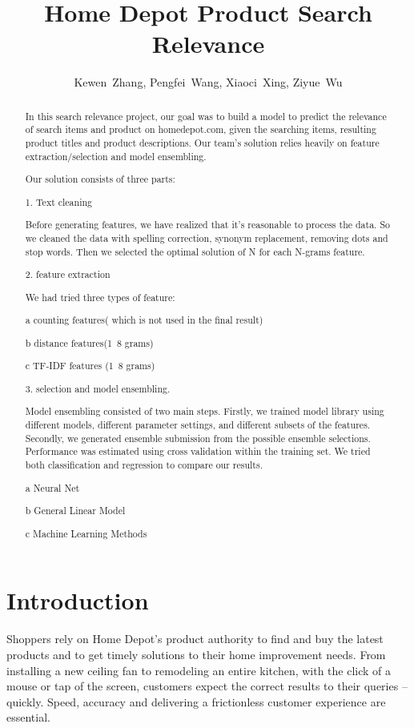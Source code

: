 \documentclass[journal]{IEEEtran}
\begin{document}
\title{Home Depot Product Search Relevance}


\author{Kewen~Zhang,
        Pengfei~Wang,
        Xiaoci~Xing,
        Ziyue~Wu}


\maketitle


\begin{abstract}
In this search relevance project, our goal was to build a model to predict the relevance of search items and product on homedepot.com, given the searching items, resulting product titles and product descriptions. Our team’s solution relies heavily on feature extraction/selection and model ensembling.

Our solution consists of three parts:

1. Text cleaning

Before generating features, we have realized that it’s reasonable to process the data. So we cleaned the data with spelling correction, synonym replacement, removing dots and stop words. Then we selected the optimal solution of N for each N-grams feature.

2. feature extraction

We had tried three types of feature:

a counting features( which is not used in the final result)

b distance features(1~8 grams)

c TF-IDF features (1~8 grams)

3. selection and model ensembling.

Model ensembling consisted of two main steps. Firstly, we trained model library using different models, different parameter settings, and different subsets of the features. Secondly, we generated ensemble submission from the possible ensemble selections. Performance was estimated using cross validation within the training set. We tried both classification and regression to compare our results.

a Neural Net

b General Linear Model

c Machine Learning Methods
\end{abstract}

\IEEEpeerreviewmaketitle



\section{Introduction}
Shoppers rely on Home Depot’s product authority to find and buy the latest products and to get timely solutions to their home improvement needs. From installing a new ceiling fan to remodeling an entire kitchen, with the click of a mouse or tap of the screen, customers expect the correct results to their queries – quickly. Speed, accuracy and delivering a frictionless customer experience are essential.
\end{document}
